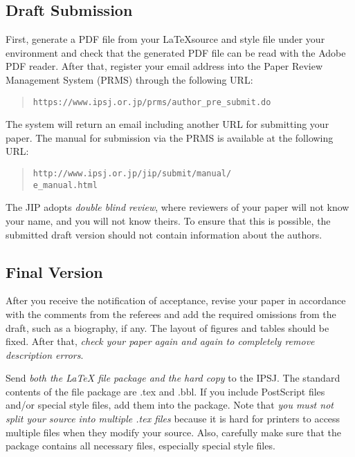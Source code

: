 \documentclass[techrep,english]{ipsj}
\def\|{\verb|}
\begin{document}

%2.2
\subsection{Draft Submission}

First, generate a PDF file from your \LaTeX source and style file under
your {\LaTeXe} environment and check that the generated PDF file can be
read with the Adobe PDF reader.  After that, register your email address
into the Paper Review Management System (PRMS) through the following
URL:
\begin{quote}
 \small
 \|https://www.ipsj.or.jp/prms/author_pre_submit.do|
\end{quote}

\noindent
The system will return an email including another URL for submitting
your paper. The manual for submission via the PRMS is available at the
following URL: 
\begin{quote}
 \small
 \|http://www.ipsj.or.jp/jip/submit/manual/|\\
 \|e_manual.html|
\end{quote}

The JIP adopts \textit{double blind review}, where reviewers of your
paper will not know your name, and you will not know theirs.  To ensure
that this is possible, the submitted draft version should not contain
information about the authors.

\subsection{Final Version}

After you receive the notification of acceptance, revise your paper in
accordance with the comments from the referees and add the required
omissions from the draft, such as a biography, if any. The layout of
figures and tables should be fixed. After that, \textit{check your paper
again and again to completely remove description errors}.

Send \textit{both the {\LaTeX} file package and the hard copy} to the
IPSJ\@. The standard contents of the file package are .tex and .bbl. If
you include PostScript files and/or special style files, add them into
the package. Note that \textit{you must not split your source into
multiple .tex files} because it is hard for printers to access multiple
files when they modify your source. Also, carefully make sure that the
package contains all necessary files, especially special style files.
\end{document}
